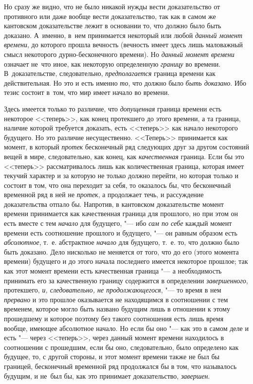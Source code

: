 Но сразу же видно, что не было никакой нужды вести доказательство от противного
или даже вообще вести доказательство, так как в самом же кантовском
доказательстве лежит в основании то, что должно было быть доказано. А~именно,
в~нем принимается некоторый или любой {\em данный момент времени}, до которого
прошла вечность (вечность имеет здесь лишь маловажный смысл некоторого
дурно-бесконечного времени). Но {\em данный момент времени} означает
не~что иное, как некоторую определенную {\em границу} во времени.
В~доказательстве, следовательно, {\em предполагается} граница времени как
действительная. Но это и есть именно {\em то}, что должно было {\em быть
доказано}. Ибо тезис состоит в~том, что мир имеет начало во времени.

Здесь имеется только то различие, что {\em допущенная} граница времени есть
некоторое <<теперь>>, как конец протекшего до этого времени, а та граница,
наличие которой требуется доказать, есть <<теперь>> как начало некоторого
будущего. Но это различие несущественно. <<Теперь>> принимается как момент,
в который {\em протек} бесконечный ряд следующих друг за другом состояний вещей
в мире, следовательно, как конец, как {\em качественная} граница. Если бы это
<<теперь>> рассматривалось лишь как количественная граница, которая имеет
текучий характер и за которую не только должно перейти, но которая только и
состоит в том, что она переходит за себя, то оказалось бы, что бесконечный
временной ряд в ней не {\em протек}, а продолжает течь, и рассуждение
доказательства отпало бы. Напротив, в кантовском доказательстве момент времени
принимается как качественная граница для прошлого, но при этом он есть вместе
с тем {\em начало} для будущего, "--- ибо {\em сам по себе} каждый момент
времени есть соотношение прошлого и будущего, "--- он равным образом есть
{\em абсолютное}, т.~е. абстрактное {\em начало} для будущего, т.~е. то, что
должно было быть доказано. Дело нисколько не меняется от того, что до его
(этого момента времени) будущего и до этого начала последнего имеется некоторое
прошлое; так как этот момент времени есть качественная граница "--- а
необходимость принимать его за качественную границу содержится в определении
{\em завершенного}, протекшего, {\em и, следовательно, не продолжающегося},
"--- то время в нем {\em прервано} и это прошлое оказывается не находящимся
в соотношении с тем временем, которое могло быть названо будущим лишь в отношении
к этому прошедшему и которое поэтому без такого соотношения есть лишь время
вообще, имеющее абсолютное начало. Но если бы оно "--- как это в самом деле
и есть "--- через <<теперь>>, через данный момент времени находилось
в соотношении с прошедшим, если бы оно, следовательно, было определено как
будущее, то, с другой стороны, и этот момент времени также не был бы границей,
бесконечный временной ряд продолжался бы в том, что называлось будущим, и
не~был бы, как это принимает доказательство, {\em завершен}.

